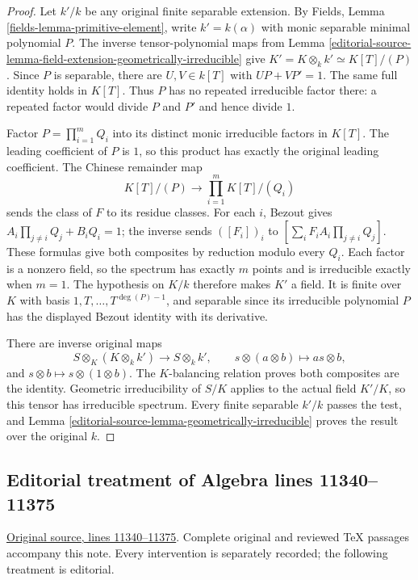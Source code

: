 \begin{proof}
Let $k'/k$ be any original finite
separable extension. By Fields,
Lemma \ref{fields-lemma-primitive-element},
write $k'=k(\alpha)$ with monic
separable minimal polynomial $P$.
The inverse tensor-polynomial maps
from Lemma
\ref{editorial-source-lemma-field-extension-geometrically-irreducible}
give $K'=K\otimes_k k'\simeq K[T]/(P)$.
Since $P$ is separable, there are
$U,V\in k[T]$ with $UP+VP'=1$.
The same full identity holds in
$K[T]$. Thus $P$ has no repeated
irreducible factor there: a repeated
factor would divide $P$ and $P'$
and hence divide $1$.

Factor $P=\prod_{i=1}^m Q_i$ into
its distinct monic irreducible
factors in $K[T]$. The leading
coefficient of $P$ is $1$, so this
product has exactly the original
leading coefficient. The Chinese
remainder map
$$
K[T]/(P)\longrightarrow\prod_{i=1}^m K[T]/(Q_i)
$$
sends the class of $F$ to its residue
classes. For each $i$, Bezout gives
$A_i\prod_{j\ne i}Q_j+B_iQ_i=1$;
the inverse sends $([F_i])_i$ to
$[\sum_i F_i A_i\prod_{j\ne i}Q_j]$.
These formulas give both composites
by reduction modulo every $Q_i$.
Each factor is a nonzero field,
so the spectrum has exactly $m$
points and is irreducible exactly
when $m=1$. The hypothesis on
$K/k$ therefore makes $K'$ a field.
It is finite over $K$ with basis
$1,T,\ldots,T^{\deg(P)-1}$, and
separable since its irreducible
polynomial $P$ has the displayed
Bezout identity with its derivative.

There are inverse original maps
$$
S\otimes_K(K\otimes_k k')\longrightarrow S\otimes_k k',
\qquad s\otimes(a\otimes b)\longmapsto as\otimes b,
$$
and $s\otimes b\mapsto s\otimes(1\otimes b)$.
The $K$-balancing relation proves
both composites are the identity.
Geometric irreducibility of $S/K$
applies to the actual field $K'/K$,
so this tensor has irreducible
spectrum. Every finite separable
$k'/k$ passes the test, and Lemma
\ref{editorial-source-lemma-geometrically-irreducible}
proves the result over the original $k$.
\end{proof}


\subsection{Editorial treatment of Algebra lines 11340--11375}

\hypertarget{algebra-context-144}{}

\noindent\href{https://github.com/stacks/stacks-project/blob/a04446e57ec1fbc252a871afcec7752fb2807b14/algebra.tex\#L11340}{Original source, lines 11340--11375}. Complete original and reviewed TeX passages accompany this note. Every intervention is separately recorded; the following treatment is editorial.



